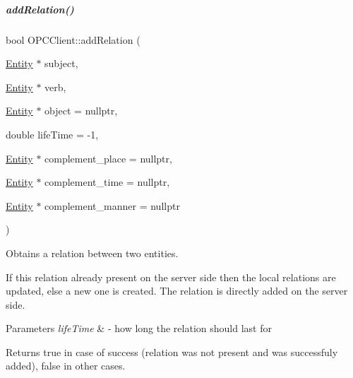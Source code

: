 \mbox{\label{group__icubclient__clients_ab0ef7754465e8fdd7b199d47e10f3d54}} 
\subparagraph{\texorpdfstring{add\+Relation()}{addRelation()}\hspace{0.1cm}{\footnotesize\ttfamily [2/2]}}
{\footnotesize\ttfamily bool O\+P\+C\+Client\+::add\+Relation (\begin{DoxyParamCaption}\item[{\hyperlink{group__icubclient__representations_classicubclient_1_1Entity}{Entity} $\ast$}]{subject,  }\item[{\hyperlink{group__icubclient__representations_classicubclient_1_1Entity}{Entity} $\ast$}]{verb,  }\item[{\hyperlink{group__icubclient__representations_classicubclient_1_1Entity}{Entity} $\ast$}]{object = {\ttfamily nullptr},  }\item[{double}]{life\+Time = {\ttfamily -\/1},  }\item[{\hyperlink{group__icubclient__representations_classicubclient_1_1Entity}{Entity} $\ast$}]{complement\+\_\+place = {\ttfamily nullptr},  }\item[{\hyperlink{group__icubclient__representations_classicubclient_1_1Entity}{Entity} $\ast$}]{complement\+\_\+time = {\ttfamily nullptr},  }\item[{\hyperlink{group__icubclient__representations_classicubclient_1_1Entity}{Entity} $\ast$}]{complement\+\_\+manner = {\ttfamily nullptr} }\end{DoxyParamCaption})}



Obtains a relation between two entities. 

If this relation already present on the server side then the local relations are updated, else a new one is created. The relation is directly added on the server side. 
\begin{DoxyParams}{Parameters}
{\em life\+Time} & -\/ how long the relation should last for \\
\hline
\end{DoxyParams}
\begin{DoxyReturn}{Returns}
true in case of success (relation was not present and was successfuly added), false in other cases. 
\end{DoxyReturn}


